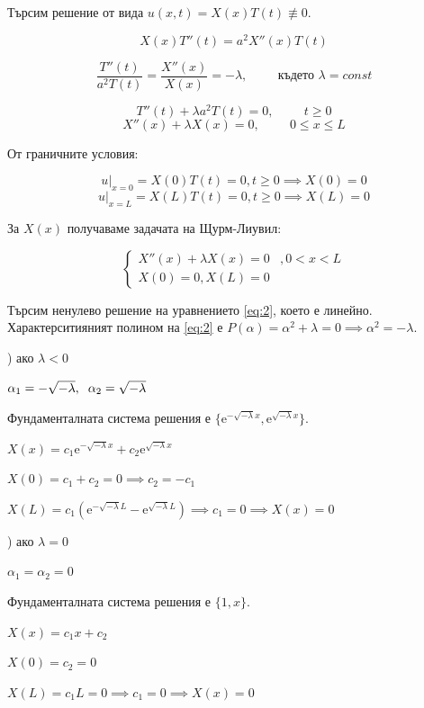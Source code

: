 \documentclass[14pt]{extarticle}
\let\frac\dfrac
\newcommand{\me}{\mathrm{e}}
\begin{document}
Търсим решение от вида $u(x,t) = X(x)T(t) \not\equiv 0$.

\[ X(x)T''(t) = a^2X''(x)T(t) \]

\[ \frac{T''(t)}{a^2T(t)} = \frac{X''(x)}{X(x)} = -\lambda , \hspace{1cm} \mbox{където } \lambda = const \]

\[ T''(t) + \lambda a^2T(t) = 0 , \hspace{1cm} t \geq 0 \]
\[ X''(x) + \lambda X(x) = 0 , \hspace{1cm} 0 \leq x \leq L \]

От граничните условия:

\[ u \big|_{x=0} = X(0)T(t) = 0 , t \geq 0 \implies X(0) = 0 \]
\[ u \big|_{x=L} = X(L)T(t) = 0 , t \geq 0 \implies X(L) = 0 \]

За $X(x)$ получаваме задачата на Щурм-Лиувил:

\begin{equation}
\left\{
	\begin{array}{ll}
		X''(x) + \lambda X(x) = 0 & , 0 < x < L \\ \tag{2}\label{eq:2}
		X(0) = 0, X(L) = 0
	\end{array}
\right.
\end{equation}

Търсим ненулево решение на уравнението \eqref{eq:2}, което е линейно. Характерситияният полином на \eqref{eq:2} е $P(\alpha) = \alpha^2 + \lambda = 0 \implies \alpha^2 = -\lambda$.

) ако $\lambda < 0$

$ \alpha_1 = -\sqrt{-\lambda}, \hspace{2mm} \alpha_2 = \sqrt{-\lambda} $

Фундаменталната система решения е $\{\me^{-\sqrt{-\lambda}x}, \me^{\sqrt{-\lambda}x}\}$.

$X(x) = c_1\me^{-\sqrt{-\lambda}x} + c_2\me^{\sqrt{-\lambda}x}$

$X(0) = c_1 + c_2 = 0 \implies c_2 = -c_1$

$X(L) = c_1\left( \me^{-\sqrt{-\lambda}L} - \me^{\sqrt{-\lambda}L} \right) \implies c_1 = 0 \implies X(x) = 0$

) ако $\lambda = 0$

$ \alpha_1 = \alpha_2 = 0 $

Фундаменталната система решения е $\{1, x\}$.

$X(x) = c_1x + c_2$

$X(0) = c_2 = 0$

$X(L) = c_1L = 0 \implies c_1 = 0 \implies X(x) = 0$
\end{document}
